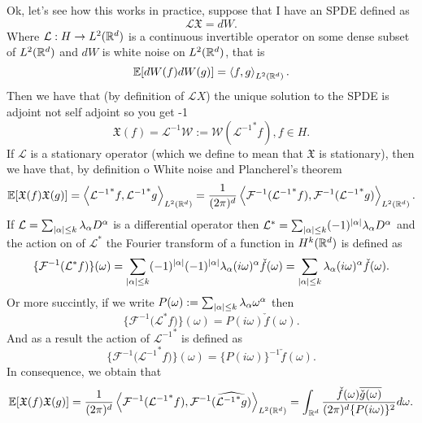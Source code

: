 \documentclass[12pt]{article}
\newcommand{\red}[1]{{\color{red}#1}}
\newcommand{\Ww}{\mathcal{W}}\newcommand{\Aa}{\mathcal{A}}\newcommand{\Bb}{\mathcal{B}}\newcommand{\Cc}{\mathcal{C}}\newcommand{\Ee}{\mathcal{E}}\newcommand{\Ff}{\mathcal{F}}\newcommand{\Gg}{\mathcal{G}}\newcommand{\Hh}{\mathcal{H}}\newcommand{\Kk}{\mathcal{K}}\newcommand{\Ll}{\mathcal{L}}\newcommand{\Mm}{\mathcal{M}}\newcommand{\Nn}{\mathcal{N}}\newcommand{\Pp}{\mathcal{P}}\newcommand{\Qq}{\mathcal{Q}}\newcommand{\Rr}{{\mathcal R}}\newcommand{\Ss}zzzzz\newcommand{\Tt}{{\mathcal T}}\newcommand{\Zz}{{\mathcal Z}}\newcommand{\Uu}{{\mathcal U}}
\newcommand{\br}[1]{\left\langle#1\right\rangle}
\begin{document}
\begin{CJK*}{UTF8}{gbsn}
	Ok, let's see how this works in practice, suppose that I have an SPDE defined as
	\begin{equation*}
		\Ll\mathfrak{X}=dW.
	\end{equation*}
	Where $\Ll:H\to L^2(\R^d)$ is a continuous invertible operator on some dense subset of $L^2({\mathbb R}^d)$ and $dW$ is white noise on  $L^2({\mathbb R}^d)$, that is
	\begin{equation*}
		\E[dW(f)dW(g)]=\br{f,g}_{L^2(\R^d)}.
	\end{equation*}
	Then we have that (by definition of $\Ll X$)   the unique solution to the SPDE is \red{adjoint not self adjoint so you get -1}
	\begin{equation*}
		\mathfrak{X}(f)=\mathcal{L}^{-1}\Ww:=\Ww({\Ll^{-1}}^*f), f\in H.
	\end{equation*}
	If $\Ll$ is a stationary operator (which we define to mean that $\mathfrak{X}$ is stationary), then we have that, by definition o White noise and Plancherel's theorem
	\begin{equation*}
		\E[\mathfrak{X}(f)\mathfrak{X}(g)]=\br{{\Ll^{-1}}^*f,{\Ll^{-1}}^*g}_{L^2(\R^d)}=\frac{1}{(2\pi)^d}\br{\mathcal{F}^{-1}({{\Ll^{-1}}^* f)},\mathcal{F}^{-1}({{\Ll^{-1}}^* g)}}_{L^2(\R^d)}.
	\end{equation*}
	If $\Ll=\sum _{\abs{\alpha}\leq k} \lambda _\alpha D^\alpha $ is a differential operator then $\Ll^*=\sum _{\abs{\alpha}\leq k} (-1)^\abs{\alpha}\lambda _\alpha D^\alpha $ and the action on of $\mathcal{L}^*$ the Fourier transform of a function in $H^k({\mathbb R}^d)$ is defined as
	\begin{equation*}
		\{\mathcal{F}^{-1}({\Ll^* f)}\}(\omega)= \sum _{\abs{\alpha}\leq k}(-1)^\abs{\alpha}(-1)^\abs{\alpha} \lambda _\alpha (i\omega)^\alpha \check{f}(\omega)=\sum _{\abs{\alpha}\leq k}\lambda _\alpha (i\omega)^\alpha \check{f}(\omega).
	\end{equation*}
	Or more succintly, if we write $P(\omega):=\sum _{\abs{\alpha}\leq k}\lambda _\alpha \omega^\alpha$ then
	\begin{equation*}
		\{\mathcal{F}^{-1}({\Ll^* f)}\}(\omega)=P(i\omega)\check{f}(\omega).
	\end{equation*}
	And as a result the action of ${\Ll^{-1}}^*$ is defined as
	\begin{equation*}
		\{\mathcal{F}^{-1}({{\Ll^{-1}}^* f)}\}(\omega)= \{P(i\omega)\}^{-1}\check{f}(\omega).
	\end{equation*}
	In consequence, we obtain that
	\begin{equation*}
		\E[\mathfrak{X}(f)\mathfrak{X}(g)]=\frac{1}{(2\pi)^d}\br{\mathcal{F}^{-1}({{\Ll^{-1}}^*f}),\mathcal{F}^{-1}({\widehat{{\Ll^{-1}}^*g}})}_{L^2(\R^d)}=\int_{\R^d}\frac{\check{f}(\omega)\overline{\check{g}(\omega)}}{(2\pi)^d\{P(i\omega)\}^{2}} d\omega.

\end{equation*}
\end{CJK*}
\end{document}
